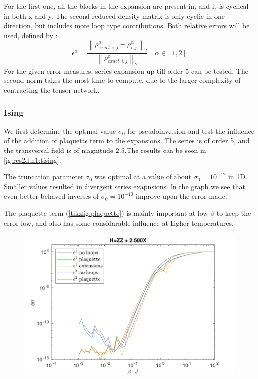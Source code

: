 For the first one, all the blocks in the expansion are present in, and it is cyclical in both x and y. The second reduced density matrix is only cyclic in one direction, but includes more loop type contributions. Both relative errors will be used, defined by :
\begin{equation}
    \epsilon^{\alpha} = \frac{  {  \left \|  \rho^{\alpha}_{exact,  i,j}- \rho^{\alpha}_{ i,j}  \right \|} _{2}  }{ {  \left\|  \rho^{\alpha}_{exact,  i,j} \right \|}_2} \quad \alpha \in [1,2]
\end{equation}
For the given error measures, series expansion up till order 5 can be tested. The second norm takes the most time to compute, due to the larger complexity of contracting the tensor network.

\subsubsection{Ising}

We first determine the optimal value $\sigma_0$ for pseudoinversion and test the influence of the addition of plaquette term to the expansions. The series is of order 5, and the transversal field is of magnitude 2.5.The results can be seen in \cref{ig:res2d:n1:tising}.

The truncation parameter $\sigma_0$ was optimal at a value of about $\sigma_0=10^{-12}$ in 1D. Smaller values resulted in divergent series exapnsions. In the graph we see that even better behaved inverses of $\sigma_0=10^{-10}$ improve upon the error made.

The plaquette term (\cref{tikzfig:plaquette}) is mainly important at low $\beta$ to keep the error low, and also has some considarable influence at higher temperatures.

\begin{figure}
    \center
    \includegraphics[width=\textwidth]{Figuren/benchmarking/2D_Err01_t_sing.pdf}
    \caption{ }
    \label{fig:res2d:n1:tising}
\end{figure}

